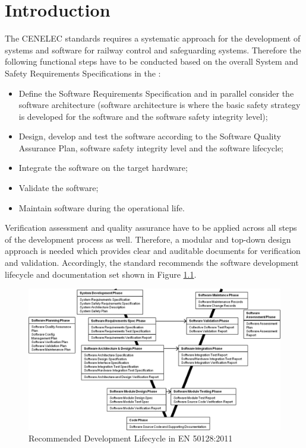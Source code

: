 \documentclass{./template/openetcs_report}
\begin{document}
\mainmatter

\chapter{Introduction}

The CENELEC standards requires a systematic approach for the development of systems and software for railway control and safeguarding systems. Therefore the following functional steps have to be conducted based on the overall System and Safety Requirements Specifications in the \citeauthor{EN50128:2011} :

\vspace{-10pt}
\begin{itemize} [topsep=2pt, partopsep=2pt,itemsep=2pt,parsep=2pt]
  \item  Define the Software Requirements Specification and in parallel consider the software architecture (software architecture is where the basic safety strategy is developed for the software and the software safety integrity level); 
  \item Design, develop and test the software according to the Software Quality Assurance Plan, software safety integrity level and the software lifecycle;
  \item Integrate the software on the target hardware;
  \item Validate the software;
  \item Maintain software during the operational life. 
\end{itemize}

Verification assessment and quality assurance have to be applied across all steps of the development process as well. Therefore, a modular and top-down design approach is needed which provides clear and auditable documents for verification and validation. Accordingly, the standard recommends the  software development lifecycle  and documentation set shown in Figure \ref{fig:Development-lifecycle-EN50128}.

\begin{figure}[h]
\centering
\includegraphics[scale=0.6]{Development-lifecycle-EN50128-own.png}
\caption{Recommended Development Lifecycle in EN 50128:2011}
\label{fig:Development-lifecycle-EN50128}
\end{figure}
\end{document}
